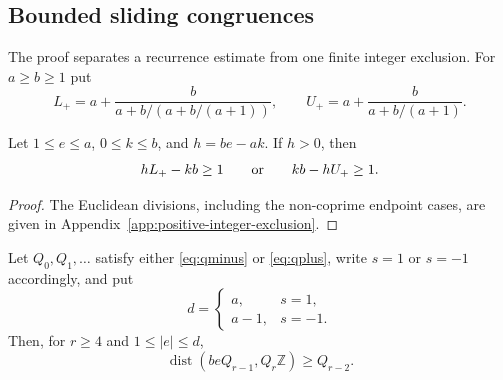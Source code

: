 \subsection{Bounded sliding congruences}

The proof separates a recurrence estimate from one finite integer exclusion.
For $a\ge b\ge1$ put
\[
L_+=a+\frac{b}{a+b/(a+b/(a+1))},\qquad
U_+=a+\frac{b}{a+b/(a+1)}.
\]

\begin{lemma}
\label{lem:positive-integer-exclusion}
Let $1\le e\le a$, $0\le k\le b$, and $h=be-ak$.  If $h>0$, then
\[
hL_+-kb\ge1\qquad\hbox{or}\qquad kb-hU_+\ge1.
\]
\end{lemma}

\begin{proof}
The Euclidean divisions, including the non-coprime endpoint cases, are given
in Appendix~\ref{app:positive-integer-exclusion}.
\end{proof}

\begin{lemma}
\label{lem:nearest-multiple-separation}
Let $Q_0,Q_1,\ldots$ satisfy either \eqref{eq:qminus} or \eqref{eq:qplus},
write $s=1$ or $s=-1$ accordingly, and put
\[
d=\begin{cases}a,&s=1,\\a-1,&s=-1.\end{cases}
\]
Then, for $r\ge4$ and $1\le |e|\le d$,
\begin{equation}
\operatorname{dist}(beQ_{r-1},Q_r\mathbb Z)\ge Q_{r-2}.
\label{eq:quadratic-separation}
\end{equation}
\end{lemma}

